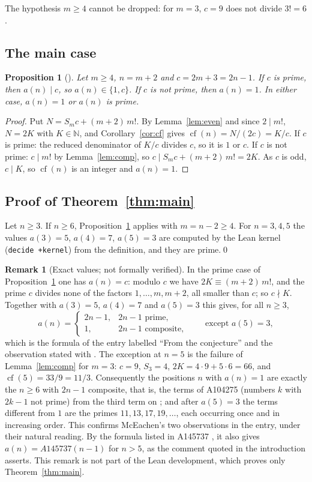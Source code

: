 \documentclass[11pt]{amsart}
\theoremstyle{plain}
\newtheorem{proposition}[theorem]{Proposition}
\theoremstyle{definition}
\newtheorem{remark}[theorem]{Remark}
\newcommand{\N}{\mathbb{N}}
\DeclareMathOperator{\cf}{cf}
\begin{document}
The hypothesis $m\ge4$ cannot be dropped: for $m=3$, $c=9$ does not divide $3!=6$.

\subsection{The main case}

\begin{proposition}[]\label{prop:main}
Let $m\ge4$, $n=m+2$ and $c=2m+3=2n-1$. If $c$ is prime, then $a(n)\mid c$, so $a(n)\in\{1,c\}$. If $c$ is not prime, then $a(n)=1$. In either case, $a(n)=1$ or $a(n)$ is prime.
\end{proposition}

\begin{proof}
Put $N=S_mc+(m+2)\,m!$. By Lemma~\ref{lem:even} and since $2\mid m!$, $N=2K$ with $K\in\N$, and Corollary~\ref{cor:cf} gives $\cf(n)=N/(2c)=K/c$.
If $c$ is prime: the reduced denominator of $K/c$ divides $c$, so it is $1$ or $c$.
If $c$ is not prime: $c\mid m!$ by Lemma~\ref{lem:comp}, so $c\mid S_mc+(m+2)\,m!=2K$. As $c$ is odd, $c\mid K$, so $\cf(n)$ is an integer and $a(n)=1$.
\end{proof}

\subsection{Proof of Theorem~\ref{thm:main}}
Let $n\ge3$. If $n\ge6$, Proposition~\ref{prop:main} applies with $m=n-2\ge4$. For $n=3,4,5$ the values $a(3)=5$, $a(4)=7$, $a(5)=3$ are computed by the Lean kernel (\texttt{decide +kernel}) from the definition, and they are prime.\qed

\begin{remark}[Exact values; not formally verified]\label{rem:exact}
In the prime case of Proposition~\ref{prop:main} one has $a(n)=c$: modulo $c$ we have $2K\equiv(m+2)\,m!$, and the prime $c$ divides none of the factors $1,\dots,m,m+2$, all smaller than $c$; so $c\nmid K$. Together with $a(3)=5$, $a(4)=7$ and $a(5)=3$ this gives, for all $n\ge3$,
\[
  a(n)=\begin{cases}2n-1,&2n-1\text{ prime},\\1,&2n-1\text{ composite},\end{cases}\qquad\text{except }a(5)=3,
\]
which is the formula of the entry labelled ``From the conjecture'' and the observation stated with \cite[Conjecture~3.1]{Bz}. The exception at $n=5$ is the failure of Lemma~\ref{lem:comp} for $m=3$: $c=9$, $S_3=4$, $2K=4\cdot9+5\cdot6=66$, and $\cf(5)=33/9=11/3$. Consequently the positions $n$ with $a(n)=1$ are exactly the $n\ge6$ with $2n-1$ composite, that is, the terms of A104275 (numbers $k$ with $2k-1$ not prime) from the third term on \cite{A104275}; and after $a(5)=3$ the terms different from $1$ are the primes $11,13,17,19,\dots$, each occurring once and in increasing order. This confirms McEachen's two observations in the entry, under their natural reading. By the formula listed in A145737 \cite{A145737}, it also gives $a(n)=A145737(n-1)$ for $n>5$, as the comment quoted in the introduction asserts. This remark is not part of the Lean development, which proves only Theorem~\ref{thm:main}.
\end{remark}
\end{document}
